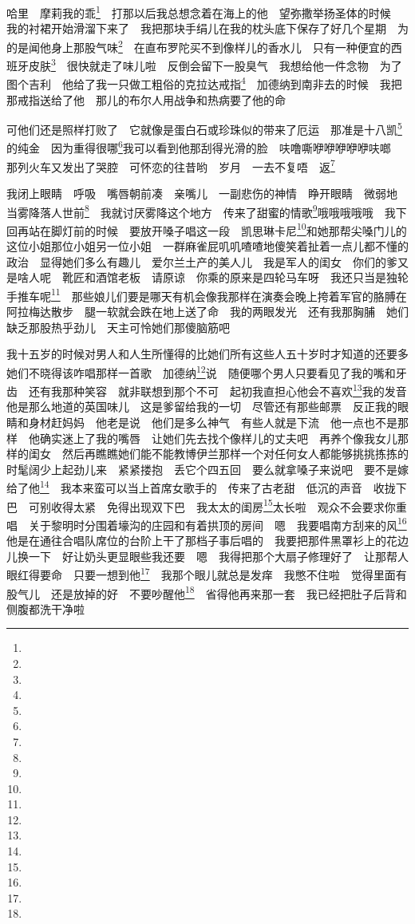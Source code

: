 \par 哈里　摩莉我的乖\footnote{}　打那以后我总想念着在海上的他　望弥撒举扬圣体的时候　我的衬裙开始滑溜下来了　我把那块手绢儿在我的枕头底下保存了好几个星期　为的是闻他身上那股气味\footnote{}　在直布罗陀买不到像样儿的香水儿　只有一种便宜的西班牙皮肤\footnote{}　很快就走了味儿啦　反倒会留下一股臭气　我想给他一件念物　为了图个吉利　他给了我一只做工粗俗的克拉达戒指\footnote{}　加德纳到南非去的时候　我把那戒指送给了他　那儿的布尔人用战争和热病要了他的命　
\par 可他们还是照样打败了　它就像是蛋白石或珍珠似的带来了厄运　那准是十八凯\footnote{}的纯金　因为重得很哪\footnote{}我可以看到他那刮得光滑的脸　呋噜嘶咿咿咿咿咿呋啷　那列火车又发出了哭腔　可怀恋的往昔哟　岁月　一去不复唔　返\footnote{}　
\par 我闭上眼睛　呼吸　嘴唇朝前凑　亲嘴儿　一副悲伤的神情　睁开眼睛　微弱地　当雾降落人世前\footnote{}　我就讨厌雾降这个地方　传来了甜蜜的情歌\footnote{}哦哦哦哦哦　我下回再站在脚灯前的时候　要放开嗓子唱这一段　凯思琳卡尼\footnote{}和她那帮尖嗓门儿的这位小姐那位小姐另一位小姐　一群麻雀屁叽叽喳喳地傻笑着扯着一点儿都不懂的政治　显得她们多么有趣儿　爱尔兰土产的美人儿　我是军人的闺女　你们的爹又是啥人呢　靴匠和酒馆老板　请原谅　你乘的原来是四轮马车呀　我还只当是独轮手推车呢\footnote{}　那些娘儿们要是哪天有机会像我那样在演奏会晚上挎着军官的胳膊在阿拉梅达散步　腿一软就会跌在地上送了命　我的两眼发光　还有我那胸脯　她们缺乏那股热乎劲儿　天主可怜她们那傻脑筋吧　
\par 我十五岁的时候对男人和人生所懂得的比她们所有这些人五十岁时才知道的还要多　她们不晓得该咋唱那样一首歌　加德纳\footnote{}说　随便哪个男人只要看见了我的嘴和牙齿　还有我那种笑容　就非联想到那个不可　起初我直担心他会不喜欢\footnote{}我的发音　他是那么地道的英国味儿　这是爹留给我的一切　尽管还有那些邮票　反正我的眼睛和身材赶妈妈　他老是说　他们是多么神气　有些人就是下流　他一点也不是那样　他确实迷上了我的嘴唇　让她们先去找个像样儿的丈夫吧　再养个像我女儿那样的闺女　然后再瞧瞧她们能不能教博伊兰那样一个对任何女人都能够挑挑拣拣的时髦阔少上起劲儿来　紧紧搂抱　丢它个四五回　要么就拿嗓子来说吧　要不是嫁给了他\footnote{}　我本来蛮可以当上首席女歌手的　传来了古老甜　低沉的声音　收拢下巴　可别收得太紧　免得出现双下巴　我太太的闺房\footnote{}太长啦　观众不会要求你重唱　关于黎明时分围着壕沟的庄园和有着拱顶的房间　嗯　我要唱南方刮来的风\footnote{}　他是在通往合唱队席位的台阶上干了那档子事后唱的　我要把那件黑罩衫上的花边儿换一下　好让奶头更显眼些我还要　嗯　我得把那个大扇子修理好了　让那帮人眼红得要命　只要一想到他\footnote{}　我那个眼儿就总是发痒　我憋不住啦　觉得里面有股气儿　还是放掉的好　不要吵醒他\footnote{}　省得他再来那一套　我已经把肚子后背和侧腹都洗干净啦　
